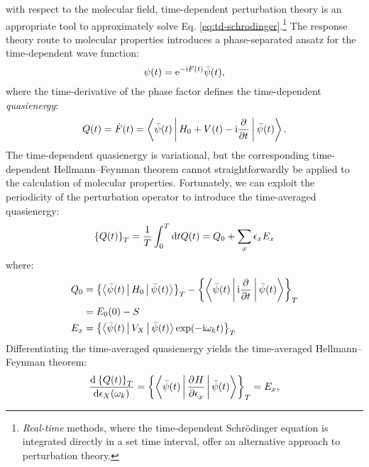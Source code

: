  with respect to the
molecular field, time-dependent perturbation theory is an appropriate
tool to approximately solve Eq.
\eqref{eq:td-schrodinger}.\footnote{\emph{Real-time} methods, where the
time-dependent Schr\"{o}dinger equation is integrated directly in a
set time interval, offer an alternative approach to perturbation
theory.\autocite{Castro2004-tn, Tannor2007-xq, Konishi2009-zb}}
The response theory route to molecular properties introduces a
phase-separated ansatz for the time-dependent wave function:
\begin{equation}\label{eq:phase-separated}
  \psi(t) = \mathrm{e}^{-\mathrm{i}F(t)}\bar{\psi}(t),
\end{equation}
where the time-derivative of the phase factor defines the time-dependent
\emph{quasienergy}:
\begin{equation}
  Q(t) = \dot{F}(t) = \Braket{\bar{\psi}(t) |
  H_0 + V(t) - \mathrm{i}\frac{\partial^{}} {\partial t^{}}
  | \bar{\psi}(t)}.
\end{equation}
The time-dependent quasienergy is variational, but the corresponding
time-dependent Hellmann--Feynman theorem cannot straightforwardly be
applied to the calculation of molecular properties.\autocite{Christiansen1998-pe, Pawlowski2015-sq}
Fortunately, we can exploit the periodicity of the perturbation operator
to introduce the time-averaged quasienergy:
\begin{equation}
  \left\lbrace Q(t)\right\rbrace_T =
  \frac{1}{T} \int_{0}^{T} \mathop{}\!\mathrm{d} t Q(t) =
 Q_0 + \sum_{x}\epsilon_x E_x
\end{equation}
where:
\begin{subequations}
 \begin{align}
  Q_0 &= \left\lbrace \Braket{\bar{\psi}(t) | H_0 | \bar{\psi}(t)} \right\rbrace_T
- \left\lbrace \Braket{\bar{\psi}(t) | \mathrm{i} \frac{\partial^{}} {\partial t^{}} |
\bar{\psi}(t)}\right\rbrace_T \nonumber \\
&= E_0(0) - S \\
  E_x &= \left\lbrace \Braket{\bar{\psi}(t) | V_X | \bar{\psi}(t)}\exp(-\mathrm{i}\omega_k t) \right\rbrace_T
 \end{align}
\end{subequations}
Differentiating the time-averaged quasienergy yields the time-averaged
Hellmann--Feynman theorem:
\begin{equation}\label{eq:tave-hellfeyn}
  \frac{\mathop{}\!\mathrm{d}^{}\left\lbrace Q(t)\right\rbrace_T}{\mathop{}\!\mathrm{d} \epsilon_X(\omega_k)^{}}
  =
  \left\lbrace\Braket{\bar{\psi}(t) | \frac{\partial^{}H} {\partial \epsilon_x^{}} | \bar{\psi}(t)}\right\rbrace_T
  = E_x,
\end{equation}
